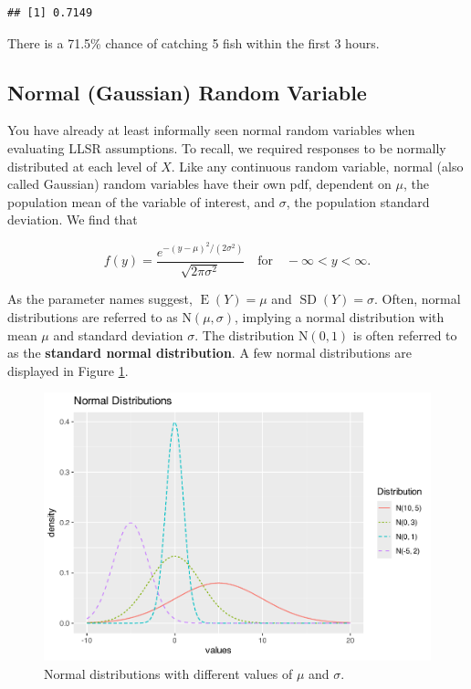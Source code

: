 \documentclass[
]{krantz}
\newcommand{\E}{\operatorname{E}}
\newcommand{\SD}{\operatorname{SD}}
\begin{document}
\begin{verbatim}
## [1] 0.7149
\end{verbatim}

There is a 71.5\% chance of catching 5 fish within the first 3 hours.

\hypertarget{normal-gaussian-random-variable}{%
\subsection{Normal (Gaussian) Random Variable}\label{normal-gaussian-random-variable}}

You have already at least informally seen normal random variables when evaluating LLSR assumptions. To recall, we required responses to be normally distributed at each level of \(X\). Like any continuous random variable, normal (also called Gaussian) random variables have their own pdf, dependent on \(\mu\), the population mean of the variable of interest, and \(\sigma\), the population standard deviation. We find that

\begin{equation}
f(y) =  \frac{e^{-(y-\mu)^2/ (2 \sigma^2)}}{\sqrt{2\pi\sigma^2}} \quad \textrm{for} \quad -\infty < y < \infty.
\label{eq:normalRV}
\end{equation}

As the parameter names suggest, \(\E(Y) = \mu\) and \(\SD(Y) = \sigma\). Often, normal distributions are referred to as \(\textrm{N}(\mu, \sigma)\), implying a normal distribution  with mean \(\mu\) and standard deviation \(\sigma\). The distribution \(\textrm{N}(0,1)\) is often referred to as the \textbf{standard normal distribution}. A few normal distributions are displayed in Figure \ref{fig:multNorm}.



\begin{figure}

{\centering \includegraphics[width=0.6\linewidth]{bookdown-BeyondMLR_files/figure-latex/multNorm-1} 

}

\caption{Normal distributions with different values of \(\mu\) and \(\sigma\).}\label{fig:multNorm}
\end{figure}
\end{document}
